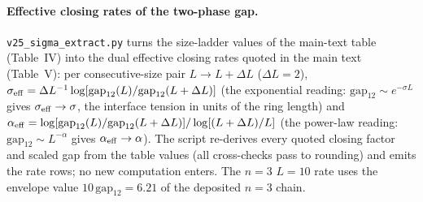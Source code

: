 \documentclass[aps,prx,reprint,superscriptaddress,nobibnotes,longbibliography]{revtex4-2}
\begin{document}
\paragraph{Effective closing rates of the two-phase gap.}
\texttt{v25\_sigma\_extract.py} turns the size-ladder values of the
main-text table (Table~IV) into the dual effective closing
rates quoted in the main text (Table~V): per
consecutive-size pair $L\to L+\Delta L$ ($\Delta L=2$),
$\sigma_{\rm eff}=\Delta L^{-1}\log[\mathrm{gap}_{12}(L)/\mathrm{gap}_{12}(L+\Delta L)]$
(the exponential reading: $\mathrm{gap}_{12}\sim e^{-\sigma L}$ gives
$\sigma_{\rm eff}\to\sigma$, the interface tension in units of the ring
length) and
$\alpha_{\rm eff}=\log[\mathrm{gap}_{12}(L)/\mathrm{gap}_{12}(L+\Delta L)]/\log[(L+\Delta L)/L]$
(the power-law reading: $\mathrm{gap}_{12}\sim L^{-\alpha}$ gives
$\alpha_{\rm eff}\to\alpha$).  The script re-derives every quoted
closing factor and scaled gap from the table values (all cross-checks
pass to rounding) and emits the rate rows; no new computation enters.
The $n=3$ $L=10$ rate uses the envelope value
$10\,\mathrm{gap}_{12}=6.21$ of the deposited $n=3$ chain.
\end{document}
